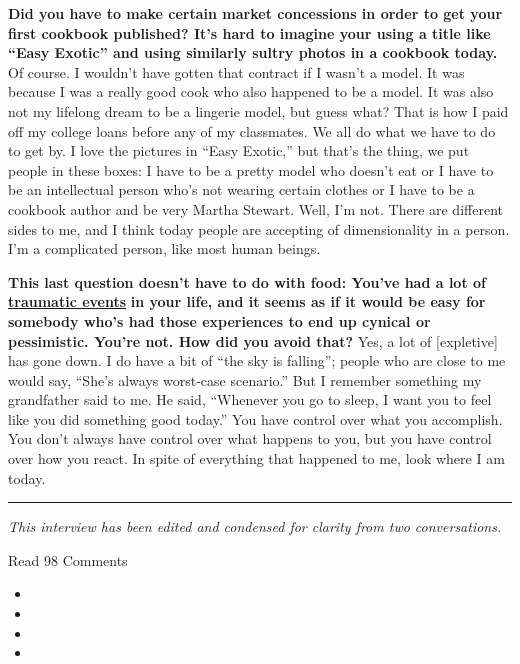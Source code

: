\textbf{Did you have to make certain market concessions in order to get
your first cookbook published? It's hard to imagine your using a title
like ``Easy Exotic'' and using similarly sultry photos in a cookbook
today.} Of course. I wouldn't have gotten that contract if I wasn't a
model. It was because I was a really good cook who also happened to be a
model. It was also not my lifelong dream to be a lingerie model, but
guess what? That is how I paid off my college loans before any of my
classmates. We all do what we have to do to get by. I love the pictures
in ``Easy Exotic,'' but that's the thing, we put people in these boxes:
I have to be a pretty model who doesn't eat or I have to be an
intellectual person who's not wearing certain clothes or I have to be a
cookbook author and be very Martha Stewart. Well, I'm not. There are
different sides to me, and I think today people are accepting of
dimensionality in a person. I'm a complicated person, like most human
beings.

\textbf{This last question doesn't have to do with food: You've had a
lot of}
\textbf{\href{http://nytimes3xbfgragh.onion\#tooltip-12}{traumatic
events}} \textbf{in your life, and it seems as if it would be easy for
somebody who's had those experiences to end up cynical or pessimistic.
You're not. How did you avoid that?} Yes, a lot of {[}expletive{]} has
gone down. I do have a bit of ``the sky is falling''; people who are
close to me would say, ``She's always worst-case scenario.'' But I
remember something my grandfather said to me. He said, ``Whenever you go
to sleep, I want you to feel like you did something good today.'' You
have control over what you accomplish. You don't always have control
over what happens to you, but you have control over how you react. In
spite of everything that happened to me, look where I am today.

\begin{center}\rule{0.5\linewidth}{\linethickness}\end{center}

\emph{This interview has been edited and condensed for clarity from two
conversations.}

Read 98 Comments

\begin{itemize}
\item
\item
\item
\item
\end{itemize}

